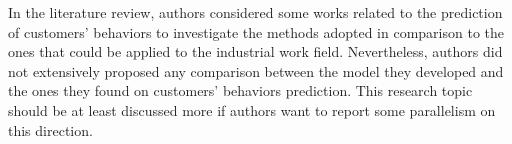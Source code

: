 \documentclass[preprint,11pt,3p]{elsarticle}
\begin{document}
\begin{tcolorbox}[colback=r_color1,colframe=r_color2,title=Response Q1 :]
			      
			      
			      
			      
			      
			      
			
		
			
\end{tcolorbox}
\begin{tcolorbox}[colback=q_color1,colframe=q_color2,title=Q2  :]	
	In the literature review, authors considered some works related to the prediction of customers' behaviors to investigate the methods adopted in comparison to the ones that could be applied to the industrial work field. Nevertheless, authors did not extensively proposed any comparison between the model they developed and the ones they found on customers' behaviors prediction. This research topic should be at least discussed more if authors want to report some parallelism on this direction.
\end{tcolorbox}
\end{document}
